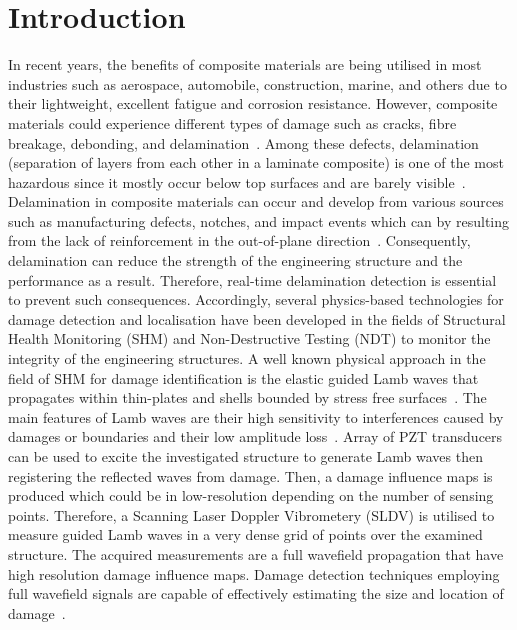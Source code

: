 \section{Introduction}
In recent years, the benefits of composite materials are being utilised in most industries such as aerospace, automobile, construction, marine, and others due to their lightweight, excellent fatigue and corrosion resistance.
However, composite materials could experience different types of damage such as cracks, fibre breakage, debonding, and delamination~\cite{ip2004delamination, smith2009composite}. 
Among these defects, delamination (separation of layers from each other in a laminate composite) is one of the most hazardous since it mostly occur below top surfaces and are barely visible~\cite{Cai2012}.
Delamination in composite materials can occur and develop from various sources such as  manufacturing defects, notches, and impact events which can by resulting from the lack of reinforcement in the out-of-plane direction~\cite{Cai2012}.
Consequently, delamination can reduce the strength of the engineering structure and the performance as a result. 
Therefore, real-time delamination detection is essential to prevent such consequences.  
Accordingly, several physics-based technologies for damage detection and localisation have been developed in the fields of Structural Health Monitoring (SHM) and Non-Destructive Testing (NDT) to monitor the integrity of the engineering structures.
A well known physical approach in the field of SHM for damage identification is the elastic guided Lamb waves that propagates within thin-plates and shells bounded by stress free surfaces~\cite{mitra2016guided}.
The main features of Lamb waves are their high sensitivity to interferences caused by damages or boundaries and their low amplitude loss~\cite{Keulen2014}.
Array of PZT transducers can be used to excite the investigated structure to generate Lamb waves then registering the reflected waves from damage. 
Then, a damage influence maps is produced which could be in low-resolution depending on the number of sensing points.
Therefore, a Scanning Laser Doppler Vibrometery (SLDV) is utilised to measure guided Lamb waves in a very dense grid of points over the examined structure.
The acquired measurements are a full wavefield propagation that have high resolution damage influence maps.
Damage detection techniques employing full wavefield signals are capable of effectively estimating the size and location of damage~\cite{Girolamo2018a, kudela2018impact}. 

